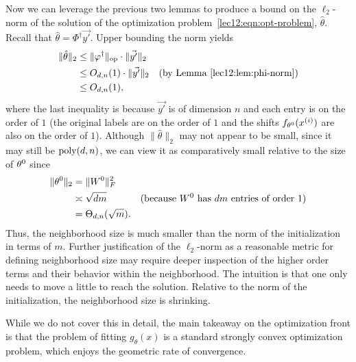 Now we can leverage the previous two lemmas to produce a bound on the $\ell_2$-norm of the solution of the optimization problem~\eqref{lec12:eqn:opt-problem}, $\hat \theta$. Recall that $\hat \theta = \Phi^\dagger \vec {y'}$. Upper bounding the norm yields
\begin{align}
    \| \hat \theta\|_2 & \leq \| \Phi^\dagger \|_{\text{op}} \cdot \|\vec{y'} \|_2  \\
    & \leq O_{d, n} (1) \cdot \|\vec{y'} \|_2 &\text{(by Lemma~\ref{lec12:lem:phi-norm})} \\
    & \leq  O_{d, n} (1),
\end{align}
where the last inequality is because $\vec{y'}$ is of dimension $n$ and each entry is on the order of $1$ (the original labels are on the order of $1$ and the shifts $f_{\thetazero}(x\sp{i})$ are also on the order of $1$). Although $\| \hat \theta\|_2$ may not appear to be small, since it may still be $\poly(d, n)$, we can view it as comparatively small relative to the size of $\thetazero$ since
\begin{align}
    \| \thetazero \|_2 &= \| W^0 \|_F^2 \\
    &\asymp \sqrt {dm} &\text{(because $ W^0$ has $dm$ entries of order $1$)} \\
    &= \Theta_{d, n}(\sqrt m).
\end{align}
Thus, the neighborhood size is much smaller than the norm of the initialization in terms of $m$. Further justification of the $\ell_2$-norm as a reasonable metric for defining neighborhood size may require deeper inspection of the higher order terms and their behavior within the neighborhood. The intuition is that one only needs to move a little to reach the solution. Relative to the norm of the initialization, the neighborhood size is shrinking.

\begin{remark}
While we do not cover this in detail, the main takeaway on the optimization front is that the problem of fitting $g_\theta(x)$ is a standard strongly convex optimization problem, which enjoys the geometric rate of convergence.
\end{remark}



